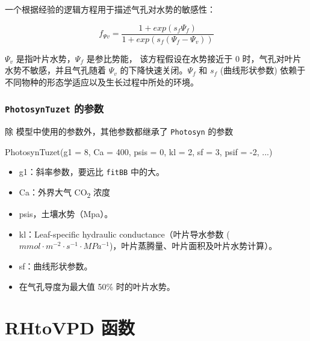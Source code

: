 \documentclass[
]{krantz}
\makeatletter
\newenvironment{Shaded}{\begin{snugshade}}{\end{snugshade}}
\newcommand{\AttributeTok}[1]{\textcolor[rgb]{0.77,0.63,0.00}{#1}}
\newcommand{\DecValTok}[1]{\textcolor[rgb]{0.00,0.00,0.81}{#1}}
\newcommand{\FunctionTok}[1]{\textcolor[rgb]{0.00,0.00,0.00}{#1}}
\newcommand{\NormalTok}[1]{#1}
\newcommand{\SpecialCharTok}[1]{\textcolor[rgb]{0.00,0.00,0.00}{#1}}
\providecommand{\tightlist}{%
  \setlength{\itemsep}{0pt}\setlength{\parskip}{0pt}}
\newenvironment{kframe}{%
\medskip{}
\setlength{\fboxsep}{.8em}
 \def\at@end@of@kframe{}%
 \ifinner\ifhmode%
  \def\at@end@of@kframe{\end{minipage}}%
  \begin{minipage}{\columnwidth}%
 \fi\fi%
 \def\FrameCommand##1{\hskip\@totalleftmargin \hskip-\fboxsep
 \colorbox{shadecolor}{##1}\hskip-\fboxsep
     \hskip-\linewidth \hskip-\@totalleftmargin \hskip\columnwidth}%
 \MakeFramed {\advance\hsize-\width
   \@totalleftmargin\z@ \linewidth\hsize
   \@setminipage}}%
 {\par\unskip\endMakeFramed%
 \at@end@of@kframe}
\renewenvironment{Shaded}{\begin{kframe}}{\end{kframe}}
\makeatother
\begin{document}
一个根据经验的逻辑方程用于描述气孔对水势的敏感性：

\begin{equation}
f_{\Psi v} = \frac{1 + exp(s_f \Psi_f)}{1 + exp(s_f(\Psi_f - \Psi_v))}
\label{eq:ftuzet}
\end{equation}

\(\Psi_v\) 是指叶片水势，\(\Psi_f\) 是参比势能， 该方程假设在水势接近于 0 时，气孔对叶片水势不敏感，并且气孔随着 \(\Psi_v\) 的下降快速关闭。\(\Psi_f\) 和 \(s_f\) (曲线形状参数) 依赖于不同物种的形态学适应以及生长过程中所处的环境。

\hypertarget{photosyntuzet_para}{%
\subsection{\texorpdfstring{\texttt{PhotosynTuzet} 的参数}{PhotosynTuzet 的参数}}\label{photosyntuzet_para}}

除 \citet{tuzet2003a} 模型中使用的参数外，其他参数都继承了 \texttt{Photosyn} 的参数

\begin{Shaded}
\begin{Highlighting}[]
\FunctionTok{PhotosynTuzet}\NormalTok{(}\AttributeTok{g1 =} \DecValTok{8}\NormalTok{, }\AttributeTok{Ca =} \DecValTok{400}\NormalTok{, }\AttributeTok{psis =} \DecValTok{0}\NormalTok{,}
              \AttributeTok{kl =} \DecValTok{2}\NormalTok{, }\AttributeTok{sf =} \DecValTok{3}\NormalTok{, }\AttributeTok{psif =} \SpecialCharTok{{-}}\DecValTok{2}\NormalTok{,}
\NormalTok{...)}
\end{Highlighting}
\end{Shaded}

\begin{itemize}
\tightlist
\item
  g1：斜率参数，要远比 \texttt{fitBB} 中的大。
\item
  Ca：外界大气 CO\textsubscript{2} 浓度
\item
  psis，土壤水势（Mpa）。
\item
  kl：Leaf-speciﬁc hydraulic conductance（叶片导水参数 (\(mmol \cdot m^{-2} \cdot s^{-1} \cdot MPa^{-1}\))，叶片蒸腾量、叶片面积及叶片水势计算）。
\item
  sf：曲线形状参数。
\item
  在气孔导度为最大值 50\% 时的叶片水势。
\end{itemize}

\cleardoublepage

\hypertarget{rhtovpd}{%
\chapter{RHtoVPD 函数}\label{rhtovpd}}
\end{document}
